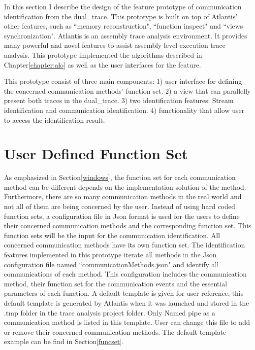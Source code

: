 

\label{chapter:newsol}
In this section I describe the design of the feature prototype of communication identification from the dual\_trace. This prototype is built on top of Atlantis' other features, such as ``memory reconstruction", ``function inspect" and ``views synchronization". Atlantis is an assembly trace analysis environment. It provides many powerful and novel features to assist assembly level execution trace analysis.\cite{huang2017atlantis} This prototype implemented the algorithms described in Chapter\ref{chapter:alo} as well as the user interfaces for the feature.

This prototype consist of three main components: 1) user interface for defining the concerned communication methods' function set. 2) a view that can parallelly present both traces in the dual\_trace. 3) two identification features: Stream identification and communication identification. 4) functionality that allow user to access the identification result.


\section{User Defined Function Set}\label{functionset}
As emphasized in Section\ref{windows}, the function set for each communication method can be different depends on the implementation solution of the method. Furthermore, there are so many communication methods in the real world and not all of them are being concerned by the user. Instead of using hard coded function sets, a configuration file in Json format is used for the users to define their concerned communication methods and the corresponding function set. This function sets will be the input for the communication identification. All concerned communication methods have its own function set. The identification features implemented in this prototype iterate all methods in the Json configuration file named ``communicationMethods.json" and identify all communications of each method. This configuration includes the communication method, their function set for the communication events and the essential parameters of each function. A default template is given for user reference, this default template is generated by Atlantis when it was launched and stored in the .tmp folder in the trace analysis project folder. Only Named pipe as a communication method is listed in this template. User can change this file to add or remove their concerned communication methods. The default template example can be find in Section\ref{funcset}.

